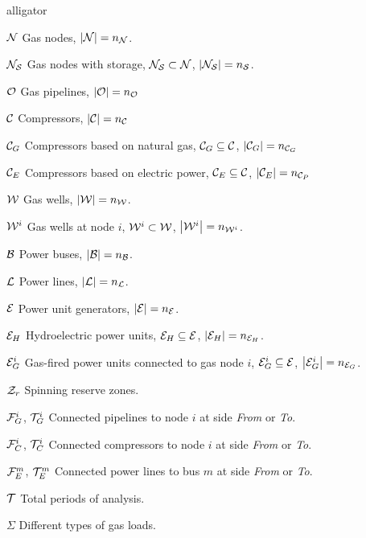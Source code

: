 \begin{labeling}{alligator}
\item [$\cal{N}$] Gas nodes, $\left| \cal{N} \right|= n_{\cal{N}}$.
\item [$\cal{N}_{S}$] Gas nodes with storage, $\cal{N}_{S} \subset \cal{N} $, $\left| \cal{N}_{S} \right|= n_{\cal{S}}$.
\item [${\cal{O}}$] Gas pipelines, $\left| \cal{O}  \right| = n_{\cal{O}}$
\item [${\cal{C}}$] Compressors, $\left| \cal{C}  \right| = n_{\cal{C}}$ 
\item [${\cal{C}}_{G}$] Compressors based on natural gas, ${\cal{C}}_{G} \subseteq {\cal{C}}$,   \hspace{5mm}   $\left| {\cal{C}}_{G}  \right| = n_{{\cal{C}}_{G}}$ 
\item [${\cal{C}}_{E}$] Compressors based on electric power, ${\cal{C}}_{E} \subseteq {\cal{C}}$,   \hspace{5mm}  $\left| {\cal{C}}_{E}  \right| = n_{{\cal{C}}_{P}}$ 
\item [${\cal{W}}$] Gas wells, $\left| \cal{W} \right|= n_{\cal{W}}$.
\item [${\cal{W}}^{i}$] Gas wells at node $i$, ${\cal{W}}^{i} \subset \cal{W} $, $\left| {\cal{W}}^{i} \right|= n_{{\cal{W}}^{i}}$.
\item [$\cal{B}$] Power buses, $\left| \cal{B} \right|= n_{\cal{B}}$.
\item [$\cal{L}$] Power lines, $\left| \cal{L} \right|= n_{\cal{L}}$.
\item [$\cal{E}$] Power unit generators, $\left| \cal{E} \right|= n_{\cal{E}}$.
\item [${\cal{E}}_{H}$] Hydroelectric power units, ${\cal{E}}_{H} \subseteq \cal{E} $, $\left| {\cal{E}}_{H} \right|= n_{{\cal{E}}_{H}}$.
\item [${\cal{E}}^{i}_{G}$] Gas-fired power units connected to gas node $i$, \break ${\cal{E}}^{i}_{G} \subseteq \cal{E}$, $\left| {\cal{E}}^{i}_{G} \right|= n_{{\cal{E}}_{G}}$.
\item [${\cal{Z}}_{r}$] Spinning reserve zones. 
\item [${\cal{F}}^{i}_{G}$, ${\cal{T}}^{i}_{G}$] Connected pipelines to node $i$ at side \textit{From} or \textit{To}.
\item [${\cal{F}}^{i}_{C}$, ${\cal{T}}^{i}_{C}$] Connected compressors to node $i$ at side \textit{From} or \textit{To}.
\item [${\cal{F}}^{m}_{E}$, ${\cal{T}}^{m}_{E}$] Connected power lines to bus $m$ at side \textit{From} or \textit{To}. 
\item [$\cal{T}$] Total periods of analysis.
\item [$\Sigma$] Different types of gas loads.
\end{labeling}


